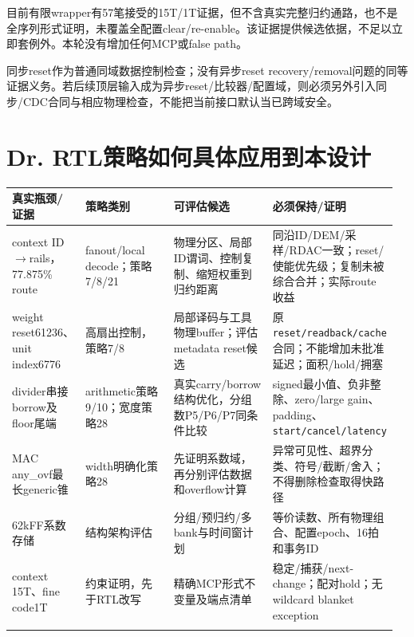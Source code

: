 \documentclass[UTF8,fontset=fandol,10pt,a4paper,openany]{ctexrep}
\newcommand{\code}[1]{\nolinkurl{#1}}
\begin{document}
目前有限wrapper有57笔接受的15T/1T证据，但不含真实完整归约通路，也不是全序列形式证明，未覆盖全配置clear/re-enable。该证据提供候选依据，不足以立即套例外。本轮没有增加任何MCP或false path。


同步reset作为普通同域数据控制检查；没有异步reset recovery/removal问题的同等证据义务。若后续顶层输入成为异步reset/比较器/配置域，则必须另外引入同步/CDC合同与相应物理检查，不能把当前接口默认当已跨域安全。


\section{Dr. RTL策略如何具体应用到本设计}


\begingroup\small\setlength{\tabcolsep}{2pt}\renewcommand{\arraystretch}{1.25}\begin{longtable}{@{}>{\raggedright\arraybackslash}p{0.19\linewidth}>{\raggedright\arraybackslash}p{0.24\linewidth}>{\raggedright\arraybackslash}p{0.27\linewidth}>{\raggedright\arraybackslash}p{0.26\linewidth}@{}}
\toprule
\textbf{真实瓶颈/证据} & \textbf{策略类别} & \textbf{可评估候选} & \textbf{必须保持/证明}\\\midrule\endhead
context ID\ensuremath{\rightarrow}rails，77.875\% route & fanout/local decode；策略7/8/21 & 物理分区、局部ID谓词、控制复制、缩短权重到归约距离 & 同沿ID/DEM/采样/RDAC一致；reset/使能优先级；复制未被综合合并；实际route收益\\\addlinespace[2pt]
weight reset61236、unit index6776 & 高扇出控制，策略7/8 & 局部译码与工具物理buffer；评估metadata reset候选 & 原\code{reset/readback/cache}合同；不能增加未批准延迟；面积/hold/拥塞\\\addlinespace[2pt]
divider串接borrow及floor尾端 & arithmetic策略9/10；宽度策略28 & 真实carry/borrow结构优化，分组数P5/P6/P7同条件比较 & signed最小值、负非整除、zero/large gain、padding、\code{start/cancel/latency}\\\addlinespace[2pt]
MAC any\_ovf最长generic锥 & width明确化策略28 & 先证明系数域，再分别评估数据和overflow计算 & 异常可见性、超界分类、符号/截断/舍入；不得删除检查取得快路径\\\addlinespace[2pt]
62kFF系数存储 & 结构架构评估 & 分组/预归约/多bank与时间窗计划 & 等价读数、所有物理组合、配置epoch、16拍和事务ID\\\addlinespace[2pt]
context 15T、fine code1T & 约束证明，先于RTL改写 & 精确MCP形式不变量及端点清单 & 稳定/捕获/next-change；配对hold；无wildcard blanket exception\\\addlinespace[2pt]
\bottomrule\end{longtable}\endgroup
\end{document}
